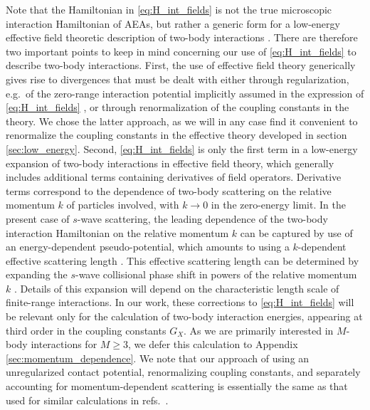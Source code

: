 \documentclass[preprint,showkeys,nofootinbib]{revtex4-1}
\newcommand{\1}{\mathds{1}}
\begin{document}
Note that the Hamiltonian in \eqref{eq:H_int_fields} is not the true
microscopic interaction Hamiltonian of AEAs, but rather a generic form
for a low-energy effective field theoretic description of two-body
interactions \cite{scazza2014observation, cazalilla2009ultracold,
  johnson2012effective, yin2014universal, johnson2009effective,
  gorshkov2010twoorbital, wall2013strongly, busch1998two}.  There are
therefore two important points to keep in mind concerning our use of
\eqref{eq:H_int_fields} to describe two-body interactions.  First, the
use of effective field theory generically gives rise to divergences
that must be dealt with either through regularization, e.g.~of the
zero-range interaction potential implicitly assumed in the expression
of \eqref{eq:H_int_fields} \cite{giorgini2008theory}, or through
renormalization of the coupling constants in the theory.  We chose the
latter approach, as we will in any case find it convenient to
renormalize the coupling constants in the effective theory developed
in section \ref{sec:low_energy}.  Second, \eqref{eq:H_int_fields} is
only the first term in a low-energy expansion of two-body interactions
in effective field theory, which generally includes additional terms
containing derivatives of field operators.  Derivative terms
correspond to the dependence of two-body scattering on the relative
momentum $k$ of particles involved, with $k\to0$ in the zero-energy
limit.  In the present case of $s$-wave scattering, the leading
dependence of the two-body interaction Hamiltonian on the relative
momentum $k$ can be captured by use of an energy-dependent
pseudo-potential, which amounts to using a $k$-dependent effective
scattering length \cite{blume2002fermi}.  This effective scattering
length can be determined by expanding the $s$-wave collisional phase
shift in powers of the relative momentum $k$ \cite{giorgini2008theory,
  flambaum1999analytical}.  Details of this expansion will depend on
the characteristic length scale of finite-range interactions.  In our
work, these corrections to \eqref{eq:H_int_fields} will be relevant
only for the calculation of two-body interaction energies, appearing
at third order in the coupling constants $G_X$.  As we are primarily
interested in $M$-body interactions for $M\ge3$, we defer this
calculation to Appendix \ref{sec:momentum_dependence}.  We note that
our approach of using an unregularized contact potential,
renormalizing coupling constants, and separately accounting for
momentum-dependent scattering is essentially the same as that used for
similar calculations in refs.~\cite{johnson2012effective,
  yin2014universal, johnson2009effective}.
\end{document}
